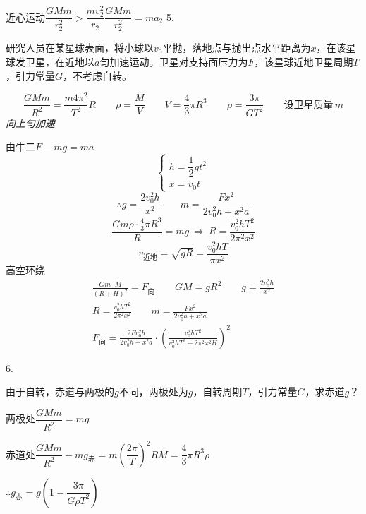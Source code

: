 近心运动\quad $\dfrac{GMm}{r_2^2}>\dfrac{mv_2^2}{r_2}$\quad $\dfrac{GMm}{r_2^2}=ma_2$
5.
\begin{problem}
研究人员在某星球表面，将小球以$v_0$平抛，落地点与抛出点水平距离为$x$，在该星球发卫星，在近地以$a$匀加速运动。卫星对支持面压力为$F$，该星球近地卫星周期$T$，引力常量$G$，不考虑自转。 %
\begin{solution}
\[
\frac{GMm}{R^2}=\frac{m4\pi^2}{T^2}R\qquad \rho=\frac{M}{V}\qquad V=\frac43\pi R^3\qquad \rho=\frac{3\pi}{GT^2}\qquad \text{设卫星质量}\,m
\]
\textit{向上匀加速}

由牛二\quad $F-mg=ma$
\[
\begin{cases}
h=\dfrac12gt^2\\[2mm]
x=v_0t
\end{cases}
\]
\[
\therefore g=\frac{2v_0^2h}{x^2}\qquad m=\frac{Fx^2}{2v_0^2h+x^2a}
\]
\[
\frac{Gm\rho\cdot\frac43\pi R^3}{R}=mg\ \Rightarrow\ R=\frac{v_0^2hT^2}{2\pi^2x^2} %
\]
\[
v_{\text{近地}}=\sqrt{gR}=\frac{v_0^2hT}{\pi x^2}
\]
高空环绕
\begin{gather*}
\frac{Gm\cdot M}{(R+H)^2}=F_{\text{向}}\qquad GM=gR^2\qquad g=\frac{2v_0^2h}{x^2}\\
R=\frac{v_0^2hT^2}{2\pi^2x^2}\qquad m=\frac{Fx^2}{2v_0^2h+x^2a}\\
F_{\text{向}}=\frac{2Fv_0^2h}{2v_0^2h+x^2a}\cdot\left(\frac{v_0^2hT^2}{v_0^2hT^2+2\pi^2x^2H}\right)^2
\end{gather*}
\end{solution}
\end{problem}
6.
\begin{problem}
由于自转，赤道与两极的$g$不同，两极处为$g$，自转周期$T$，引力常量$G$，求赤道$g$？
\begin{solution}
两极处\quad $\dfrac{GMm}{R^2}=mg$

赤道处\quad $\dfrac{GMm}{R^2}-mg_{\text{赤}}=m\left(\dfrac{2\pi}{T}\right)^2R$\quad $M=\dfrac43\pi R^3\rho$

$\therefore g_{\text{赤}}=g\left(1-\dfrac{3\pi}{G\rho T^2}\right)$
\end{solution}
\end{problem}
